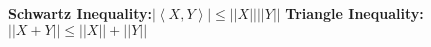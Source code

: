 {\bf Schwartz Inequality:}$\left|\left\langle X,Y\right\rangle\right|\leq||X||||Y||$
{\bf Triangle Inequality:}$\left|\left| X+Y\right|\right|\leq||X||+||Y||$